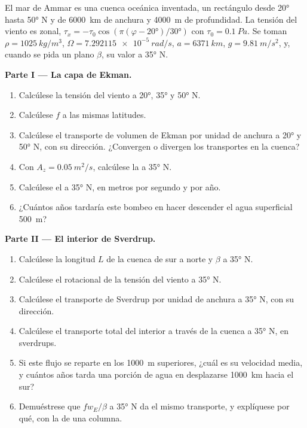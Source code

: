 \begin{problem}
\label{pb:b3:ocean-dynamics:1}
El mar de Ammar es una cuenca oceánica inventada, un rectángulo desde \ang{20} hasta
\ang{50} N y de \qty{6000}{km} de anchura y \qty{4000}{m} de profundidad. La tensión del viento es
zonal, $\tau_x = -\tau_0\cos(\pi(\varphi - \ang{20})/\ang{30})$ con $\tau_0
= \qty{0.1}{Pa}$. Se toman $\rho = \qty{1025}{kg/m^3}$, $\Omega =
\qty{7.292115e-5}{rad/s}$, $a = \qty{6371}{km}$, $g = \qty{9.81}{m/s^2}$,
y, cuando se pida un plano $\beta$, su valor a \ang{35} N.

\medskip\noindent\textbf{Parte I --- La capa de Ekman.}
\begin{enumerate}
\item Calcúlese la tensión del viento a \ang{20}, \ang{35} y \ang{50} N.
\item Calcúlese $f$ a las mismas latitudes.
\item Calcúlese el transporte de volumen de Ekman por unidad de anchura a \ang{20} y
  \ang{50} N, con su dirección. ¿Convergen o divergen los transportes en
  la cuenca?
\item Con $A_z = \qty{0.05}{m^2/s}$, calcúlese la  a \ang{35} N.
\item Calcúlese el  a \ang{35} N, en metros por segundo y por
  año.
\item ¿Cuántos años tardaría este bombeo en hacer descender el agua superficial
  \qty{500}{m}?
\end{enumerate}

\medskip\noindent\textbf{Parte II --- El interior de Sverdrup.}
\begin{enumerate}[resume]
\item Calcúlese la longitud $L$ de la cuenca de sur a norte y $\beta$ a
  \ang{35} N.
\item Calcúlese el rotacional de la tensión del viento a \ang{35} N.
\item Calcúlese el transporte de Sverdrup por unidad de anchura a \ang{35} N, con su
  dirección.
\item Calcúlese el transporte total del interior a través de la cuenca a \ang{35} N,
  en sverdrups.
\item Si este flujo se reparte en los \qty{1000}{m} superiores, ¿cuál es su
  velocidad media, y cuántos años tarda una porción de agua en desplazarse \qty{1000}{km}
  hacia el sur?
\item Demuéstrese que $fw_E/\beta$ a \ang{35} N da el mismo transporte, y
  explíquese por qué, con la  de una columna.
\end{enumerate}


\end{problem}
